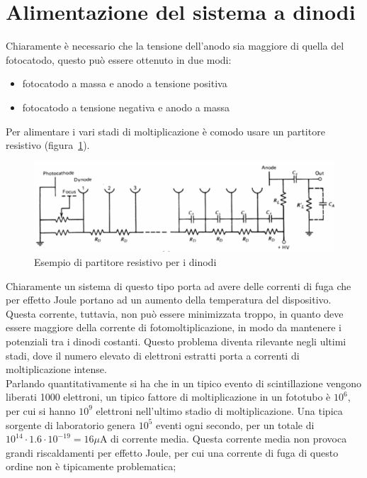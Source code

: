 \section{Alimentazione del sistema a dinodi}
Chiaramente \`e necessario che la tensione dell'anodo sia maggiore di quella del fotocatodo, questo pu\`o essere ottenuto in due modi:
\begin{itemize}
\item fotocatodo a massa e anodo a tensione positiva
\item fotocatodo a tensione negativa e anodo a massa
\end{itemize}
Per alimentare i vari stadi di moltiplicazione \`e comodo usare un partitore resistivo (figura~\ref{fig:partitoreDinodi}).
\begin{figure}[htb]
\begin{center}
\includegraphics[scale=0.80]{./Immagini/PartitoreDinodi.png}
\caption{Esempio di partitore resistivo per i dinodi}
\label{fig:partitoreDinodi}
\end{center}
\end{figure}
Chiaramente un sistema di questo tipo porta ad avere delle correnti di fuga che per effetto Joule portano ad un aumento della temperatura del dispositivo.
Questa corrente, tuttavia, non pu\`o essere minimizzata troppo, in quanto deve essere maggiore della corrente di fotomoltiplicazione, in modo da mantenere
i potenziali tra i dinodi costanti.
Questo problema diventa rilevante negli ultimi stadi, dove il numero elevato di elettroni estratti porta a correnti di moltiplicazione intense.\\
Parlando quantitativamente si ha che in un tipico evento di scintillazione vengono liberati 1000 elettroni, un tipico fattore di moltiplicazione in un fototubo
\`e $10^6$, per cui si hanno $10^9$ elettroni nell'ultimo stadio di moltiplicazione.
Una tipica sorgente di laboratorio genera $10^5$ eventi ogni secondo, per un totale di $10^{14}\cdot 1.6 \cdot 10^{-19} = 16 \mu$A di corrente media.
Questa corrente media non provoca grandi riscaldamenti per effetto Joule, per cui una corrente di fuga di questo ordine non \`e tipicamente problematica;
